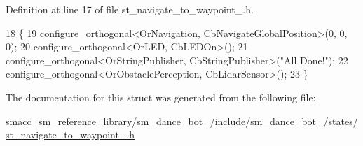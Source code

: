 Definition at line 17 of file st\+\_\+navigate\+\_\+to\+\_\+waypoint\+\_.\+h.


\begin{DoxyCode}
18   \{
19     configure\_orthogonal<OrNavigation, CbNavigateGlobalPosition>(0, 0, 0);
20     configure\_orthogonal<OrLED, CbLEDOn>();
21     configure\_orthogonal<OrStringPublisher, CbStringPublisher>(\textcolor{stringliteral}{"All Done!"});
22     configure\_orthogonal<OrObstaclePerception, CbLidarSensor>();
23   \}
\end{DoxyCode}


The documentation for this struct was generated from the following file\+:\begin{DoxyCompactItemize}
\item 
smacc\+\_\+sm\+\_\+reference\+\_\+library/sm\+\_\+dance\+\_\+bot\+\_/include/sm\+\_\+dance\+\_\+bot\+\_/states/\hyperlink{3_2include_2sm__dance__bot__3_2states_2st__navigate__to__waypoint__1_8h}{st\+\_\+navigate\+\_\+to\+\_\+waypoint\+\_.\+h}\end{DoxyCompactItemize}
